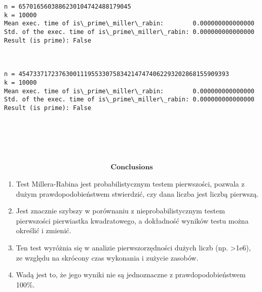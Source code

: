 \documentclass[11pt]{article}
\providecommand{\tightlist}{%
      \setlength{\itemsep}{0pt}\setlength{\parskip}{0pt}}
\begin{document}
\begin{Verbatim}[commandchars=\\\{\}]
n = 6570165603886230104742488179045
k = 10000
Mean exec. time of is\_prime\_miller\_rabin:        0.000000000000000
Std. of the exec. time of is\_prime\_miller\_rabin: 0.000000000000000
Result (is prime): False



n = 4547337172376300111955330758342147474062293202868155909393
k = 10000
Mean exec. time of is\_prime\_miller\_rabin:        0.000000000000000
Std. of the exec. time of is\_prime\_miller\_rabin: 0.000000000000000
Result (is prime): False






    \end{Verbatim}

    \hypertarget{textbfconclusions}{%
\paragraph{\texorpdfstring{\[\textbf{Conclusions}\]}{\textbackslash textbf\{Conclusions\}}}\label{textbfconclusions}}

\begin{enumerate}
\def\labelenumi{\arabic{enumi}.}
\tightlist
\item
  Test Millera-Rabina jest probabilistycznym testem pierwszości, pozwala
  z dużym prawdopodobieństwem stwierdzić, czy dana liczba jest liczbą
  pierwszą. 
\item Jest znacznie szybszy w porównaniu z nieprobabilistycznym
  testem pierwszości pierwiastka kwadratowego, a dokładność wyników
  testu można określić i zmienić. 
\item Ten test wyróżnia się w analizie
  pierwszorzędności dużych liczb (np. \textgreater1e6), ze względu na
  skrócony czas wykonania i zużycie zasobów. 
\item Wadą jest to, że jego wyniki nie są jednoznaczne z prawdopodobieństwem 100\%.
\end{enumerate}

\end{document}
